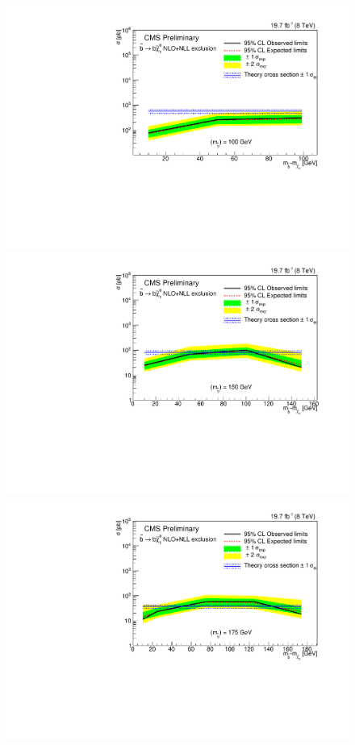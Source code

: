 \begin{figure}[!Hhtb]
  \begin{center}
  \includegraphics[scale=0.39]{Figures/sus13009/limitplots/plots/sbottom/Limit_DM_sbottom_100.pdf}
  \includegraphics[scale=0.39]{Figures/sus13009/limitplots/plots/sbottom/Limit_DM_sbottom_150.pdf}
  \includegraphics[scale=0.39]{Figures/sus13009/limitplots/plots/sbottom/Limit_DM_sbottom_175.pdf}

\end{center}
\end{figure}
